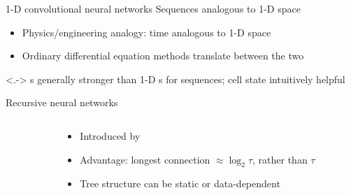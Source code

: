 \begin{frame}{1-D convolutional neural networks}
    Sequences analogous to 1-D space
    \begin{itemize}
        \item<+-> Physics/engineering analogy: time analogous to 1-D space
        \item Ordinary differential equation methods translate between the two
    \end{itemize}

    \begin{center}
        

    \end{center}

    \uncover<.->{
        \rnn{}s generally stronger than 1-D \cnn{}s for sequences;
        \rnn{} cell state intuitively helpful
    }
\end{frame}

\begin{frame}{Recursive neural networks}
    \begin{columns}
        \begin{column}{0.61\textwidth}
            
        \end{column}
        \begin{column}{0.39\textwidth}
            \begin{itemize}
                \item Introduced by \citet{PollackAI90}
                \item Advantage: longest connection $\approx \log_2 \tau$, rather than $\tau$
                \item Tree structure can be static or data-dependent
            \end{itemize}
        \end{column}
    \end{columns}
\end{frame}

